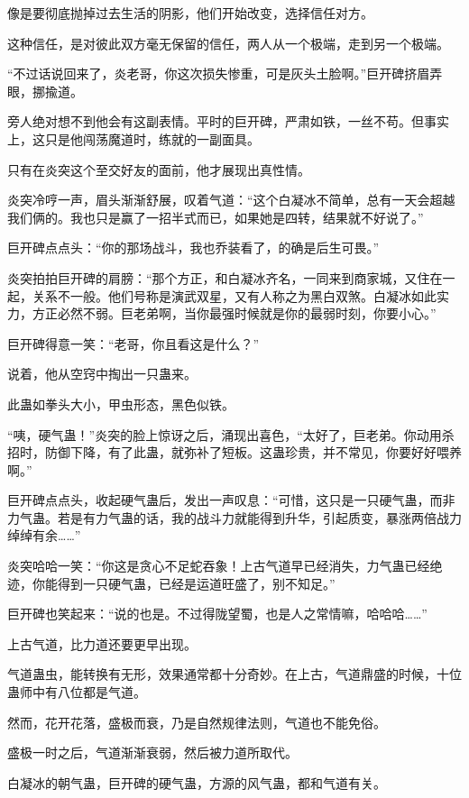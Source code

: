 \begin{this_body}
像是要彻底抛掉过去生活的阴影，他们开始改变，选择信任对方。

这种信任，是对彼此双方毫无保留的信任，两人从一个极端，走到另一个极端。

“不过话说回来了，炎老哥，你这次损失惨重，可是灰头土脸啊。”巨开碑挤眉弄眼，挪揄道。

旁人绝对想不到他会有这副表情。平时的巨开碑，严肃如铁，一丝不苟。但事实上，这只是他闯荡魔道时，练就的一副面具。

只有在炎突这个至交好友的面前，他才展现出真性情。

炎突冷哼一声，眉头渐渐舒展，叹着气道：“这个白凝冰不简单，总有一天会超越我们俩的。我也只是赢了一招半式而已，如果她是四转，结果就不好说了。”

巨开碑点点头：“你的那场战斗，我也乔装看了，的确是后生可畏。”

炎突拍拍巨开碑的肩膀：“那个方正，和白凝冰齐名，一同来到商家城，又住在一起，关系不一般。他们号称是演武双星，又有人称之为黑白双煞。白凝冰如此实力，方正必然不弱。巨老弟啊，当你最强时候就是你的最弱时刻，你要小心。”

巨开碑得意一笑：“老哥，你且看这是什么？”

说着，他从空窍中掏出一只蛊来。

此蛊如拳头大小，甲虫形态，黑色似铁。

“咦，硬气蛊！”炎突的脸上惊讶之后，涌现出喜色，“太好了，巨老弟。你动用杀招时，防御下降，有了此蛊，就弥补了短板。这蛊珍贵，并不常见，你要好好喂养啊。”

巨开碑点点头，收起硬气蛊后，发出一声叹息：“可惜，这只是一只硬气蛊，而非力气蛊。若是有力气蛊的话，我的战斗力就能得到升华，引起质变，暴涨两倍战力绰绰有余……”

炎突哈哈一笑：“你这是贪心不足蛇吞象！上古气道早已经消失，力气蛊已经绝迹，你能得到一只硬气蛊，已经是运道旺盛了，别不知足。”

巨开碑也笑起来：“说的也是。不过得陇望蜀，也是人之常情嘛，哈哈哈……”

上古气道，比力道还要更早出现。

气道蛊虫，能转换有无形，效果通常都十分奇妙。在上古，气道鼎盛的时候，十位蛊师中有八位都是气道。

然而，花开花落，盛极而衰，乃是自然规律法则，气道也不能免俗。

盛极一时之后，气道渐渐衰弱，然后被力道所取代。

白凝冰的朝气蛊，巨开碑的硬气蛊，方源的风气蛊，都和气道有关。

\end{this_body}

